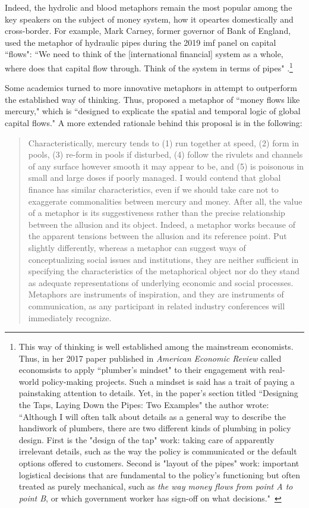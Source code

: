 Indeed, the hydrolic and blood metaphors remain the most popular among the key speakers on the subject of money system, how it opeartes domestically and cross-border. For example, Mark Carney, former governor of Bank of England, used the metaphor of hydraulic pipes during the 2019 \ac{imf} panel on capital ``flows": ``We need to think of the [international financial] system as a whole, where does that capital flow through. Think of the system in terms of pipes" \citep{imf2019}.\footnote{This way of thinking is well established among the mainstream economists. Thus, \citeauthor{duflo2017} in her 2017 paper published in \textit{American Economic Review} called economsists to apply ``plumber's mindset" to their engagement with real-world policy-making projects. Such a mindset is said has a trait of paying a painstaking attention to details. Yet, in the paper's section titled ``Designing the Taps, Laying Down the Pipes: Two Examples" the author wrote: ``Although I will often talk about details as a general way to describe the handiwork of plumbers, there are two different kinds of plumbing in policy design. First is the "design of the tap" work: taking care of apparently irrelevant details, such as the way the policy is communicated or the default options offered to customers. Second is "layout of the pipes" work: important logistical decisions that are fundamental to the policy's functioning but often treated as purely mechanical, such as \textit{the way money flows from point A to point B}, or which government worker has sign-off on what decisions."~\citep[p.~5, emphasis added]{duflo2017}}

Some academics turned to more innovative metaphors in attempt to outperform the established way of thinking. Thus, \cite{clark2005} proposed a metaphor of ``money flows like mercury," which is ``designed to explicate the spatial and temporal logic of global capital flows." A more extended rationale behind this proposal is in the following: 

\begin{quote}
Characteristically, mercury tends to (1) run together at speed, (2) form in pools, (3) re-form in pools if disturbed, (4) follow the rivulets and channels of any surface however smooth it may appear to be, and (5) is poisonous in small and large doses if poorly managed. I would contend that global finance has similar characteristics, even if we should take care not to exaggerate commonalities between mercury and money. After all, the value of a metaphor is its suggestiveness rather than the precise relationship between the allusion and its object. Indeed, a metaphor works because of the apparent tensions between the allusion and its reference point. Put slightly differently, whereas a metaphor can suggest ways of conceptualizing social issues and institutions, they are neither sufficient in specifying the characteristics of the metaphorical object nor do they stand as adequate representations of underlying economic and social processes. Metaphors are instruments of inspiration, and they are instruments of communication, as any participant in related industry conferences will immediately recognize. \citep[p.~105]{clark2005}
\end{quote}

